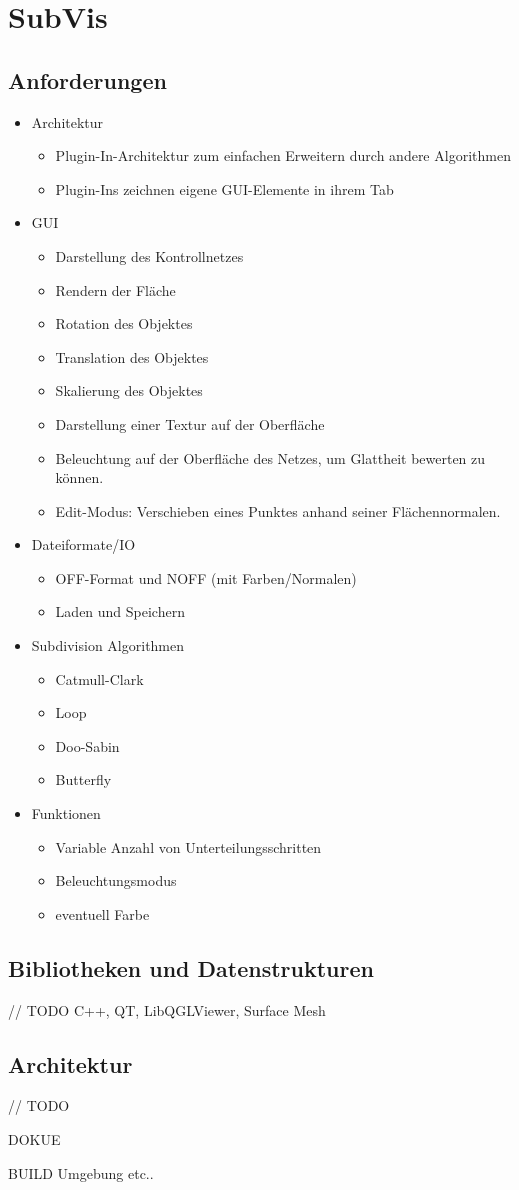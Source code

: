 \chapter{SubVis}


\section{Anforderungen}

\begin{itemize}
 \item Architektur
 \begin{itemize}
 	\item Plugin-In-Architektur zum einfachen Erweitern durch andere Algorithmen
 	\item Plugin-Ins zeichnen eigene GUI-Elemente in ihrem Tab
 \end{itemize}
 \item GUI
  \begin{itemize}
 	\item Darstellung des Kontrollnetzes
 	\item Rendern der Fläche
 	\item Rotation des Objektes 
 	\item Translation des Objektes
 	\item Skalierung des Objektes
 	\item Darstellung einer Textur auf der Oberfläche
 	\item Beleuchtung auf der Oberfläche des Netzes, um Glattheit bewerten zu können.
 	\item Edit-Modus: Verschieben eines Punktes anhand seiner Flächennormalen.
 \end{itemize}
 \item Dateiformate/IO
 \begin{itemize}
 	\item OFF-Format und NOFF (mit Farben/Normalen)
 	\item Laden und Speichern
 \end{itemize}
 \item Subdivision Algorithmen
 \begin{itemize}
 	\item Catmull-Clark
 	\item Loop
 	\item Doo-Sabin
 	\item Butterfly
 \end{itemize}
 \item Funktionen
 \begin{itemize}
  \item Variable Anzahl von Unterteilungsschritten
  \item Beleuchtungsmodus
  \item eventuell Farbe
 \end{itemize}
\end{itemize}

\section{Bibliotheken und Datenstrukturen}

// TODO C++, QT, LibQGLViewer, Surface Mesh

\section{Architektur}

// TODO

DOKUE

BUILD Umgebung etc..


